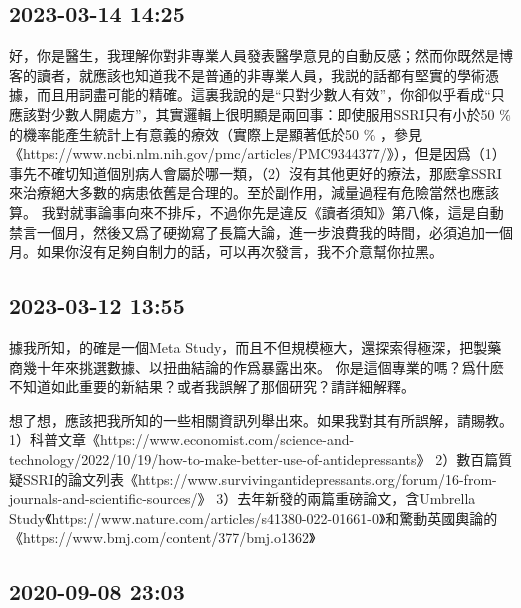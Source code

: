 \documentclass[twocolumn]{ctexart}
\begin{document}
\subsection*{2023-03-14 14:25}

好，你是醫生，我理解你對非專業人員發表醫學意見的自動反感；然而你既然是博客的讀者，就應該也知道我不是普通的非專業人員，我説的話都有堅實的學術憑據，而且用詞盡可能的精確。這裏我說的是“只對少數人有效”，你卻似乎看成“只應該對少數人開處方”，其實邏輯上很明顯是兩回事：即使服用SSRI只有小於50 \% 的機率能產生統計上有意義的療效（實際上是顯著低於50 \% ，參見《https://www.ncbi.nlm.nih.gov/pmc/articles/PMC9344377/》），但是因爲（1）事先不確切知道個別病人會屬於哪一類，（2）沒有其他更好的療法，那麽拿SSRI來治療絕大多數的病患依舊是合理的。至於副作用，減量過程有危險當然也應該算。
我對就事論事向來不排斥，不過你先是違反《讀者須知》第八條，這是自動禁言一個月，然後又爲了硬拗寫了長篇大論，進一步浪費我的時間，必須追加一個月。如果你沒有足夠自制力的話，可以再次發言，我不介意幫你拉黑。
\subsection*{2023-03-12 13:55}

據我所知，的確是一個Meta Study，而且不但規模極大，還探索得極深，把製藥商幾十年來挑選數據、以扭曲結論的作爲暴露出來。
你是這個專業的嗎？爲什麽不知道如此重要的新結果？或者我誤解了那個研究？請詳細解釋。

想了想，應該把我所知的一些相關資訊列舉出來。如果我對其有所誤解，請賜教。
1）科普文章《https://www.economist.com/science-and-technology/2022/10/19/how-to-make-better-use-of-antidepressants》
2）數百篇質疑SSRI的論文列表《https://www.survivingantidepressants.org/forum/16-from-journals-and-scientific-sources/》
3）去年新發的兩篇重磅論文，含Umbrella Study《https://www.nature.com/articles/s41380-022-01661-0》和驚動英國輿論的《https://www.bmj.com/content/377/bmj.o1362》
\subsection*{2020-09-08 23:03}
\end{document}
